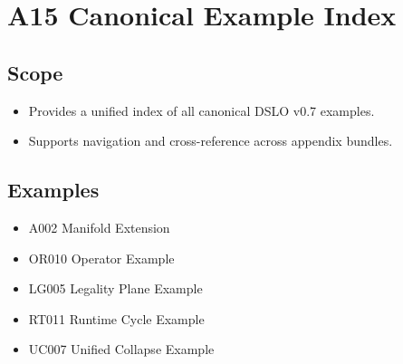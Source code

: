 \section{A15 Canonical Example Index}

\subsection{Scope}
\begin{itemize}
    \item Provides a unified index of all canonical DSLO v0.7 examples.
    \item Supports navigation and cross-reference across appendix bundles.
\end{itemize}

\subsection{Examples}
\begin{itemize}
    \item A002 Manifold Extension
    \item OR010 Operator Example
    \item LG005 Legality Plane Example
    \item RT011 Runtime Cycle Example
    \item UC007 Unified Collapse Example
\end{itemize}
